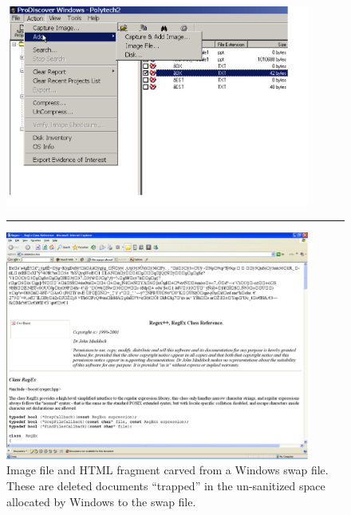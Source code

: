 \begin{figure}[ht]
\center
\includegraphics[width=100mm]{ch-carving/imageinswap.png}
\vspace{3mm}
\noindent\rule{60mm}{1pt}
\vspace{3mm}
\includegraphics[width=100mm]{ch-carving/cacheinswap.png}
\caption{Image file and HTML fragment carved from a Windows swap file.  These are deleted documents ``trapped'' in the un-sanitized space allocated by Windows to the swap file.}
\label{fig:insideswapfileå}
\end{figure}


